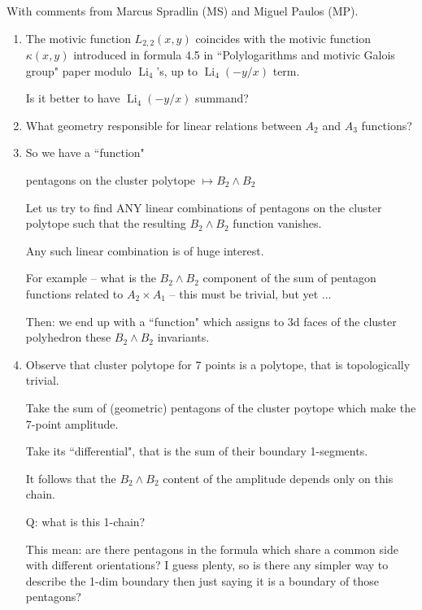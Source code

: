 \documentclass[12pt]{article}
\DeclareMathOperator{\Li}{Li}
\begin{document}
\thispagestyle{fancyplain}
 
\fancyhf{}
 
\cfoot{\fancyplain{}{\thepage}}


With comments from Marcus Spradlin (MS) and Miguel Paulos (MP).

\begin{enumerate}

\item The motivic function $L_{2,2}(x,y)$ coincides with the
motivic  function $\kappa(x,y)$ introduced in formula 4.5 in
``Polylogarithms and motivic Galois group" paper modulo $\Li_4$'s, up to
$\Li_4(-y/x)$ term.

Is it better to have $\Li_4(-y/x)$ summand?

\item What geometry responsible for linear relations between $A_2$ and $A_3$ functions?

\item So we have a ``function"

pentagons on the cluster polytope $\longmapsto B_2 \wedge B_2$

Let us try to find ANY linear combinations of pentagons on the
cluster polytope such that the resulting $B_2 \wedge B_2$ function vanishes.

Any such linear combination is of huge interest.

For example -- what is the $B_2 \wedge B_2$ component of the sum of pentagon functions related to $A_2 \times A_1$ -- this must be trivial, but yet ...

Then: we end up with a ``function" which assigns
to 3d faces of the cluster polyhedron these $B_2 \wedge B_2$ invariants.

\item Observe that cluster polytope for 7 points is a polytope, that is
topologically trivial.

Take the sum of (geometric) pentagons of the cluster poytope
which make the 7-point amplitude.

Take its ``differential", that is the sum of their boundary 1-segments.

It follows that the $B_2\wedge B_2$ content of the amplitude
depends only on this chain.

Q: what is this 1-chain?

This mean: are there pentagons in the formula which
share a common side with different orientations? I guess plenty, so
is there any simpler way to describe the 1-dim boundary then just
saying it is a boundary
of those pentagons? 


\end{enumerate}
\end{document}
